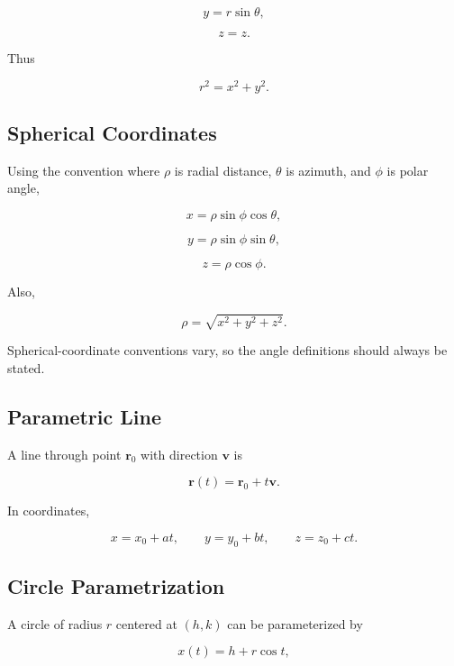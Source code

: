 \[
\boxed{
y=r\sin\theta,
}
\]

\[
\boxed{
z=z.
}
\]

Thus

\[
\boxed{
r^2=x^2+y^2.
}
\]

\subsection{Spherical Coordinates}
\label{subsec:spherical-coordinate-formulas}

Using the convention where \(\rho\) is radial distance,
\(\theta\) is azimuth, and \(\phi\) is polar angle,

\[
\boxed{
x
=
\rho\sin\phi\cos\theta,
}
\]

\[
\boxed{
y
=
\rho\sin\phi\sin\theta,
}
\]

\[
\boxed{
z
=
\rho\cos\phi.
}
\]

Also,

\[
\boxed{
\rho
=
\sqrt{x^2+y^2+z^2}.
}
\]

Spherical-coordinate conventions vary, so the angle definitions should
always be stated.

\subsection{Parametric Line}
\label{subsec:parametric-line-reference}

A line through point \(\mathbf{r}_0\) with direction \(\mathbf{v}\) is

\[
\boxed{
\mathbf{r}(t)
=
\mathbf{r}_0+t\mathbf{v}.
}
\]

In coordinates,

\[
\boxed{
x=x_0+at,
\qquad
y=y_0+bt,
\qquad
z=z_0+ct.
}
\]

\subsection{Circle Parametrization}
\label{subsec:circle-parametrization-reference}

A circle of radius \(r\) centered at \((h,k)\) can be parameterized by

\[
\boxed{
x(t)
=
h+r\cos t,
}
\]

